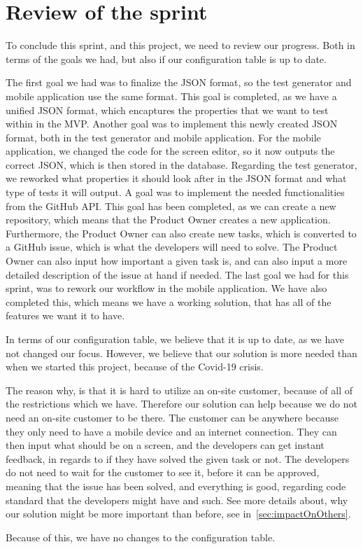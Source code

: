 \section{Review of the sprint}
To conclude this sprint, and this project, we need to review our progress.
Both in terms of the goals we had, but also if our configuration table is up to date.

The first goal we had was to finalize the JSON format, so the test generator and mobile application use the same format.
This goal is completed, as we have a unified JSON format, which encaptures the properties that we want to test within in the MVP.
Another goal was to implement this newly created JSON format, both in the test generator and mobile application.
For the mobile application, we changed the code for the screen editor, so it now outputs the correct JSON, which is then stored in the database.
Regarding the test generator, we reworked what properties it should look after in the JSON format and what type of tests it will output.
A goal was to implement the needed functionalities from the GitHub API.
This goal has been completed, as we can create a new repository, which means that the Product Owner creates a new application.
Furthermore, the Product Owner can also create new tasks, which is converted to a GitHub issue, which is what the developers will need to solve.
The Product Owner can also input how important a given task is, and can also input a more detailed description of the issue at hand if needed.
The last goal we had for this sprint, was to rework our workflow in the mobile application.
We have also completed this, which means we have a working solution, that has all of the features we want it to have.

In terms of our configuration table, we believe that it is up to date, as we have not changed our focus.
However, we believe that our solution is more needed than when we started this project, because of the Covid-19 crisis.

The reason why, is that it is hard to utilize an on-site customer, because of all of the restrictions which we have.
Therefore our solution can help because we do not need an on-site customer to be there.
The customer can be anywhere because they only need to have a mobile device and an internet connection.
They can then input what should be on a screen, and the developers can get instant feedback, in regards to if they have solved the given task or not.
The developers do not need to wait for the customer to see it, before it can be approved, meaning that the issue has been solved, and everything is good, regarding code standard that the developers might have and such.
See more details about, why our solution might be more important than before, see in~\autoref{sec:impactOnOthers}.

Because of this, we have no changes to the configuration table.